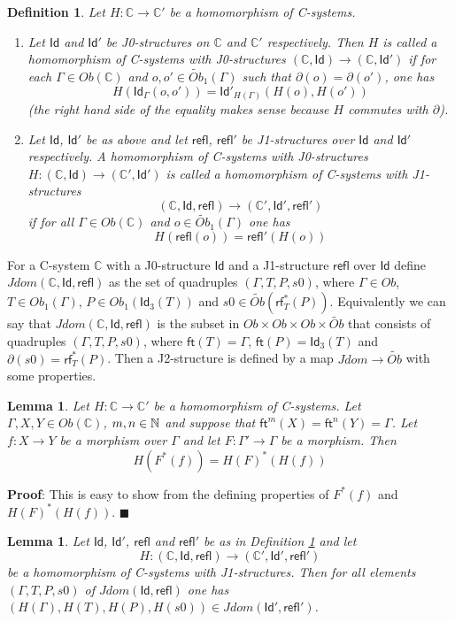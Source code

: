 \documentclass[12pt]{article}
\numberwithin{equation}{section}
\newenvironment{myproof}{{\bf Proof}:}{$\blacksquare$ \vskip 5mm }
\newtheorem{lemma}[proposition]{Lemma}
\newtheorem{definition}[proposition]{Definition}
\newcommand{\sr}{\rightarrow}
\newcommand{\nn}{{\mathbb N\rm}}
\newcommand{\wt}{\widetilde}
\newcommand{\CC}{{\mathbb C}}  %
\newcommand{\ft}{\mathsf{ft}}
\newcommand{\Id}{\mathsf{Id}} %
\newcommand{\Idx}{\mathsf{Id}_3} %
\newcommand{\refl}{\mathsf{refl}}
\newcommand{\rf}{\mathsf{rf}}
\newcommand{\Obwt}{\wt{Ob}}
\begin{document}
%
\begin{definition}
\label{2015.04.06.def1} Let $H:\CC\sr \CC'$ be a homomorphism of C-systems.
%
\begin{enumerate}
\item Let $\Id$ and $\Id'$ be J0-structures on $\CC$ and $\CC'$ respectively.  Then
  $H$ is called a homomorphism of C-systems with J0-structures $(\CC,\Id)\sr
  (\CC,\Id')$ if for each $\Gamma\in Ob(\CC)$ and $o,o'\in\Obwt_1(\Gamma)$ such
  that $\partial(o)=\partial(o')$, one has
%
$$H(\Id_{\Gamma}(o,o'))=\Id'_{H(\Gamma)}(H(o),H(o'))$$
%
(the right hand side of the equality makes sense because $H$ commutes with
  $\partial$).
% 
\item Let $\Id$, $\Id'$ be as above and let $\refl$, $\refl'$ be J1-structures
  over $\Id$ and $\Id'$ respectively. A homomorphism of C-systems with
  J0-structures $H:(\CC,\Id)\sr (\CC',\Id')$ is called a homomorphism of
  C-systems with J1-structures
%
$$(\CC,\Id,\refl)\sr (\CC',\Id',\refl')$$
%
if for all $\Gamma\in Ob(\CC)$ and $o\in \Obwt_1(\Gamma)$ one has
%
$$H(\refl(o))=\refl'(H(o))$$
%
\end{enumerate}
\end{definition}
%
For a C-system $\CC$ with a J0-structure $\Id$ and a J1-structure $\refl$ over
$\Id$ define $Jdom(\CC,\Id,\refl)$ as the set of quadruples $(\Gamma,T,P,s0)$,
where $\Gamma\in Ob$, $T\in Ob_1(\Gamma)$, $P\in Ob_1(\Idx(T))$ and $s0\in
\Obwt(\rf_T^*(P))$. Equivalently we can say that $Jdom(\CC,\Id,\refl)$ is the
subset in $Ob\times Ob\times Ob\times \Obwt$ that consists of quadruples
$(\Gamma,T,P,s0)$, where $\ft(T)=\Gamma$, $\ft(P)=\Idx(T)$ and
$\partial(s0)=\rf_T^*(P)$. Then a J2-structure is defined by a map $Jdom\sr
\Obwt$ with some properties.
%
\begin{lemma}
\label{2015.04.06.l3} Let $H:\CC\sr \CC'$ be a homomorphism of C-systems. Let
$\Gamma,X,Y\in Ob(\CC)$, $m,n\in\nn$ and suppose that
$\ft^m(X)=\ft^{n}(Y)=\Gamma$. Let $f:X\sr Y$ be a morphism over $\Gamma$ and let
$F:\Gamma'\sr \Gamma$ be a morphism. Then
%
$$H(F^*(f))=H(F)^*(H(f))$$
%
\end{lemma}
%
\begin{myproof}
This is easy to show from the defining properties of $F^*(f)$ and
$H(F)^*(H(f))$.
\end{myproof}
%
%
\begin{lemma}
\label{2015.04.06.l2} Let $\Id$, $\Id'$, $\refl$ and $\refl'$ be as in
Definition \ref{2015.04.06.def1} and let
%
$$H:(\CC,\Id,\refl)\sr (\CC',\Id',\refl')$$
%
be a homomorphism of C-systems with J1-structures. Then for all elements
$(\Gamma,T,P,s0)$ of $Jdom(\Id,\refl)$ one has $(H(\Gamma),H(T),H(P),H(s0))\in
Jdom(\Id',\refl')$.
\end{lemma}
\end{document}
